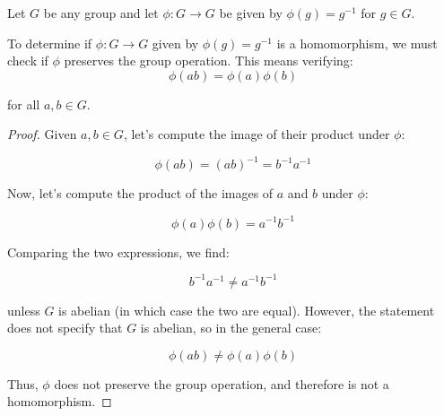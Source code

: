 \documentclass[12pt]{amsart}
\theoremstyle{definition}
\numberwithin{equation}{section}
\theoremstyle{plain}
\begin{document}
\begin{exercise}{8} Let $G$ be any group and let $\phi : G \rightarrow G$ be given by $\phi(g) = g^{-1}$ for $g \in G$.
    
    To determine if \( \phi : G \rightarrow G \) given by \( \phi(g) = g^{-1} \) is a homomorphism, we must check if \( \phi \) preserves the group operation. This means verifying:
    \[
        \phi(ab) = \phi(a) \phi(b)
    \]
        
    for all \( a, b \in G \).
        
        \begin{proof}
Given \( a, b \in G \), let's compute the image of their product under \( \phi \):

\[
\phi(ab) = (ab)^{-1} = b^{-1}a^{-1}
\]

Now, let's compute the product of the images of \( a \) and \( b \) under \( \phi \):

\[
\phi(a) \phi(b) = a^{-1} b^{-1}
\]

Comparing the two expressions, we find:

\[
b^{-1}a^{-1} \neq a^{-1} b^{-1}
\]

unless \( G \) is abelian (in which case the two are equal). However, the statement does not specify that \( G \) is abelian, so in the general case:

\[
\phi(ab) \neq \phi(a) \phi(b)
\]

Thus, \( \phi \) does not preserve the group operation, and therefore is not a homomorphism.

    \end{proof}
\end{exercise}
\vspace*{20pt}
\end{document}
